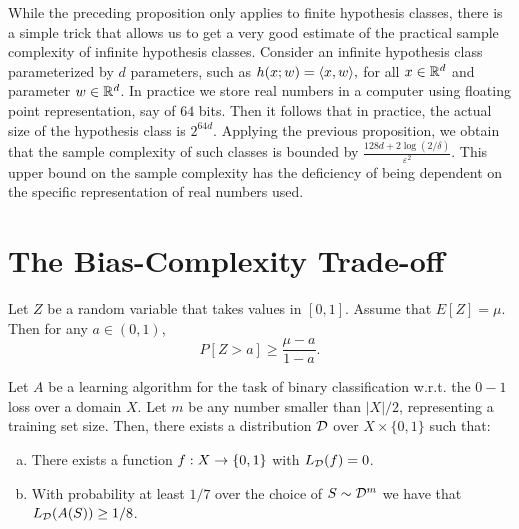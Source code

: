\documentclass[11pt,a4paper]{article}
\begin{document}
\begin{remark}
While the preceding proposition only applies to finite hypothesis classes, there is a simple trick that allows us to get a very good estimate of the practical sample complexity of infinite hypothesis classes. Consider an infinite hypothesis class parameterized by $d$ parameters, such as $h(x;w) = \langle x, w \rangle,$ for all $x\in\mathbb{R}^d$ and parameter $w\in\mathbb{R}^d$. In practice we store real numbers in a computer using floating point representation, say of $64$ bits. Then it follows that in practice, the actual size of the hypothesis class is $2^{64d}$. Applying the previous proposition, we obtain that the sample complexity of such classes is bounded by $\frac{128d+2\log{(2/\delta)}}{\varepsilon^2}$. This upper bound on the sample complexity has the deficiency of being dependent on the specific representation of real numbers used. 
\end{remark}

\section{The Bias-Complexity Trade-off}

\begin{lemma}\label{lemma:markov_ineq}
    Let $Z$ be a random variable that takes values in $[0,1]$. Assume that $E[Z] = \mu$. Then for any $a\in (0,1)$,
    \begin{equation*}
        P[Z>a]\ge \dfrac{\mu-a}{1-a}.
    \end{equation*}
\end{lemma}

\begin{proposition}
Let $A$ be a learning algorithm for the task of binary classification w.r.t. the $0-1$ loss over a domain $X$. Let $m$ be any number smaller than $|X|/2$, representing a training set size. Then, there exists a distribution $\mathcal{D}$ over $X\times \{0,1\}$ such that:
\begin{enumerate}[(a)]
    \item There exists a function $f:X\rightarrow \{0,1\}$ with $L_{\mathcal{D}}(f) = 0$.
    \item With probability at least $1/7$ over the choice of $S\sim \mathcal{D}^m$ we have that $L_{\mathcal{D}}(A(S))\ge 1/8$.
\end{enumerate}
\end{proposition}
\end{document}
